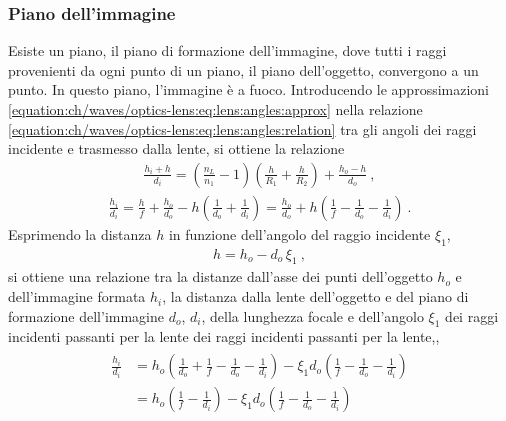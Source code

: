 \documentclass[letterpaper,10pt,italian]{jupyterBook}
\begin{document}
\subsubsection*{Piano dell’immagine}

\sphinxAtStartPar
Esiste un piano, il piano di formazione dell’immagine, dove tutti i raggi provenienti da ogni punto di un piano, il piano dell’oggetto, convergono a un punto. In questo piano, l’immagine è a fuoco. Introducendo le approssimazioni \eqref{equation:ch/waves/optics-lens:eq:lens:angles:approx} nella relazione \eqref{equation:ch/waves/optics-lens:eq:lens:angles:relation} tra gli angoli dei raggi incidente e trasmesso dalla lente, si ottiene la relazione
\begin{equation*}
\begin{split}\frac{h_i + h}{d_i} = \left(\frac{n_L}{n_1} - 1 \right)\left(\frac{h}{R_1}+\frac{h}{R_2}\right) + \frac{h_o - h}{d_o} \ ,\end{split}
\end{equation*}\begin{equation*}
\begin{split}\frac{h_i}{d_i} = \frac{h}{f} + \frac{h_o}{d_o} - h \left( \frac{1}{d_o} + \frac{1}{d_i} \right) = \frac{h_o}{d_o} + h \left( \frac{1}{f} - \frac{1}{d_o} - \frac{1}{d_i} \right)\ .\end{split}
\end{equation*}
\sphinxAtStartPar
Esprimendo la distanza \(h\) in funzione dell’angolo del raggio incidente \(\xi_1\),
\begin{equation*}
\begin{split}h = h_o - d_o \, \xi_1 \ ,\end{split}
\end{equation*}
\sphinxAtStartPar
si ottiene una relazione tra la distanze dall’asse dei punti dell’oggetto \(h_o\) e dell’immagine formata \(h_i\), la distanza dalla lente dell’oggetto e del piano di formazione dell’immagine \(d_o\), \(d_i\), della lunghezza focale e dell’angolo \(\xi_1\) dei raggi incidenti passanti per la lente dei raggi incidenti passanti per la lente,,
\begin{equation*}
\begin{split}\begin{aligned}
  \frac{h_i}{d_i}
  & = h_o \left( \frac{1}{d_o} + \frac{1}{f} - \frac{1}{d_o} - \frac{1}{d_i} \right) - \xi_1 d_o \left( \frac{1}{f} - \frac{1}{d_o} - \frac{1}{d_i} \right) \\
  & = h_o \left( \frac{1}{f} - \frac{1}{d_i} \right) - \xi_1 d_o \left( \frac{1}{f} - \frac{1}{d_o} - \frac{1}{d_i} \right) \\
\end{aligned}\end{split}
\end{equation*}
\end{document}

